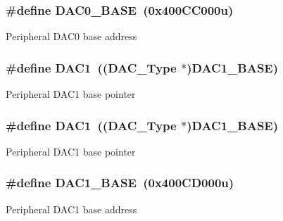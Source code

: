 \subsubsection[{\texorpdfstring{D\+A\+C0\+\_\+\+B\+A\+SE}{DAC0_BASE}}]{\setlength{\rightskip}{0pt plus 5cm}\#define D\+A\+C0\+\_\+\+B\+A\+SE~(0x400\+C\+C000u)}\hypertarget{group__DAC__Peripheral__Access__Layer_gada12ca8452e773fd8f38041872934efc}{}\label{group__DAC__Peripheral__Access__Layer_gada12ca8452e773fd8f38041872934efc}
Peripheral D\+A\+C0 base address 
\subsubsection[{\texorpdfstring{D\+A\+C1}{DAC1}}]{\setlength{\rightskip}{0pt plus 5cm}\#define D\+A\+C1~(({\bf D\+A\+C\+\_\+\+Type} $\ast$){\bf D\+A\+C1\+\_\+\+B\+A\+SE})}\hypertarget{group__DAC__Peripheral__Access__Layer_gaffb5ff8779fa698f3c7165a617d56e4f}{}\label{group__DAC__Peripheral__Access__Layer_gaffb5ff8779fa698f3c7165a617d56e4f}
Peripheral D\+A\+C1 base pointer 
\subsubsection[{\texorpdfstring{D\+A\+C1}{DAC1}}]{\setlength{\rightskip}{0pt plus 5cm}\#define D\+A\+C1~(({\bf D\+A\+C\+\_\+\+Type} $\ast$){\bf D\+A\+C1\+\_\+\+B\+A\+SE})}\hypertarget{group__DAC__Peripheral__Access__Layer_gaffb5ff8779fa698f3c7165a617d56e4f}{}\label{group__DAC__Peripheral__Access__Layer_gaffb5ff8779fa698f3c7165a617d56e4f}
Peripheral D\+A\+C1 base pointer 
\subsubsection[{\texorpdfstring{D\+A\+C1\+\_\+\+B\+A\+SE}{DAC1_BASE}}]{\setlength{\rightskip}{0pt plus 5cm}\#define D\+A\+C1\+\_\+\+B\+A\+SE~(0x400\+C\+D000u)}\hypertarget{group__DAC__Peripheral__Access__Layer_ga3383b83a296ce0a5386a0d94195e8a99}{}\label{group__DAC__Peripheral__Access__Layer_ga3383b83a296ce0a5386a0d94195e8a99}
Peripheral D\+A\+C1 base address 
